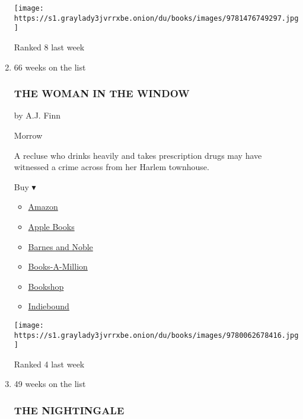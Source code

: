\begin{enumerate}
  \texttt{[image: https://s1.graylady3jvrrxbe.onion/du/books/images/9781476749297.jpg]}

  Ranked 8 last week
\item
  66 weeks on the list

  \hypertarget{the-woman-in-the-window}{%
  \subsubsection{THE WOMAN IN THE
  WINDOW}\label{the-woman-in-the-window}}

  by A.J. Finn

  Morrow

  A recluse who drinks heavily and takes prescription drugs may have
  witnessed a crime across from her Harlem townhouse.

  Buy ▾

  \begin{itemize}
  \tightlist
  \item
    \href{https://www.amazon.com/Woman-Window-Novel-J-Finn/dp/0062678418?tag=NYTBS-20}{Amazon}
  \item
    \href{https://du-gae-books-dot-nyt-du-prd.appspot.com/buy?title=THE+WOMAN+IN+THE+WINDOW\&author=AJ+Finn}{Apple
    Books}
  \item
    \href{https://www.anrdoezrs.net/click-7990613-11819508?url=https\%3A\%2F\%2Fwww.barnesandnoble.com\%2Fw\%2F\%3Fean\%3D9780062678423}{Barnes
    and Noble}
  \item
    \href{https://www.anrdoezrs.net/click-7990613-35140?url=https\%3A\%2F\%2Fwww.booksamillion.com\%2Fp\%2FTHE\%2BWOMAN\%2BIN\%2BTHE\%2BWINDOW\%2FAJ\%2BFinn\%2F9780062678423}{Books-A-Million}
  \item
    \href{https://bookshop.org/a/3546/9780062678423}{Bookshop}
  \item
    \href{https://www.indiebound.org/book/9780062678423?aff=NYT}{Indiebound}
  \end{itemize}

  \texttt{[image: https://s1.graylady3jvrrxbe.onion/du/books/images/9780062678416.jpg]}

  Ranked 4 last week
\item
  49 weeks on the list

  \hypertarget{the-nightingale}{%
  \subsubsection{THE NIGHTINGALE}\label{the-nightingale}}


\end{enumerate}
